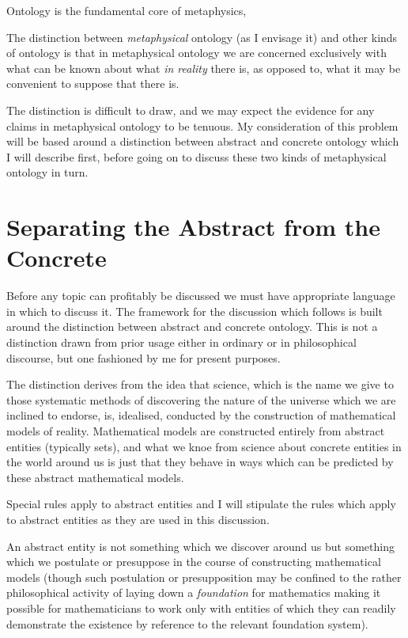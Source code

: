 \documentclass{rbjk}
\begin{document}
\begin{article}
Ontology is the fundamental core of metaphysics,

The distinction between \emph{metaphysical} ontology (as I envisage it) and other kinds of ontology is that in metaphysical ontology we are concerned exclusively with what can be known about what \emph{in reality} there is, as opposed to, what it may be convenient to suppose that there is.

The distinction is difficult to draw, and we may expect the evidence for any claims in metaphysical ontology to be tenuous.
My consideration of this problem will be based around a distinction between abstract and concrete ontology which I will describe first, before going on to discuss these two kinds of metaphysical ontology in turn.

\section{Separating the Abstract from the Concrete}

Before any topic can profitably be discussed we must have appropriate language in which to discuss it.
The framework for the discussion which follows is built around the distinction between abstract and concrete ontology.
This is not a distinction drawn from prior usage either in ordinary or in philosophical discourse, but one fashioned by me for present purposes.

The distinction derives from the idea that science, which is the name we give to those systematic methods of discovering the nature of the universe which we are inclined to endorse, is, idealised, conducted by the construction of mathematical models of reality.
Mathematical models are constructed entirely from abstract entities (typically sets), and what we knoe from science about concrete entities in the world around us is just that they behave in ways which can be predicted by these abstract mathematical models. 

Special rules apply to abstract entities and I will stipulate the rules which apply to abstract entities as they are used in this discussion.

An abstract entity is not something which we discover around us but something which we postulate or presuppose in the course of constructing mathematical models (though such postulation or presupposition may be confined to the rather philosophical activity of laying down a {\it foundation} for mathematics making it possible for mathematicians to work only with entities of which they can readily demonstrate the existence by reference to the relevant foundation system).


\end{article}
\end{document}
